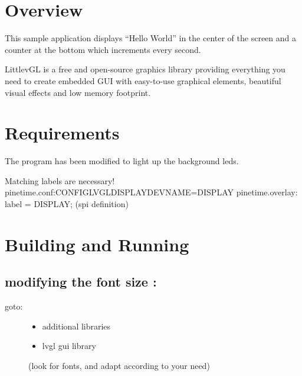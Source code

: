 \documentclass[letterpaper,10pt,english]{sphinxmanual}
\begin{document}
\section{Overview}
\label{\detokenize{lvgl:overview}}
This sample application displays “Hello World” in the center of the screen
and a counter at the bottom which increments every second.

LittlevGL is a free and open-source graphics library providing everything you need to create embedded GUI with easy-to-use graphical elements, beautiful visual effects and low memory footprint.


\section{Requirements}
\label{\detokenize{lvgl:requirements}}
The program has been modified to light up the background leds.


\begin{sphinxVerbatim}[commandchars=\\\{\}]
Matching labels are necessary!
pinetime.conf:CONFIG\PYGZus{}LVGL\PYGZus{}DISPLAY\PYGZus{}DEV\PYGZus{}NAME=\PYGZdq{}DISPLAY\PYGZdq{}
pinetime.overlay:               label = \PYGZdq{}DISPLAY\PYGZdq{}; (spi definition)
\end{sphinxVerbatim}


\section{Building and Running}
\label{\detokenize{lvgl:building-and-running}}
\begin{sphinxVerbatim}[commandchars=\\\{\}]
\end{sphinxVerbatim}


\subsection{modifying the font size :}
\label{\detokenize{lvgl:modifying-the-font-size}}
\begin{sphinxVerbatim}[commandchars=\\\{\}]
\end{sphinxVerbatim}
\begin{description}
\item[{goto:}] \leavevmode\begin{itemize}
\item {} 
additional libraries

\item {} 
lvgl gui library

\end{itemize}

(look for fonts, and adapt according to your need)

\end{description}
\end{document}

